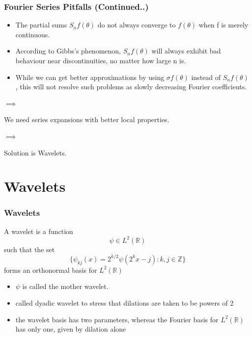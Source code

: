 \documentclass{beamer}
\begin{document}
\begin{frame}
    \frametitle{Fourier Series Pitfalls (Continued..)}
    
    \begin{itemize}
        \item The partial sums $S_n f (\theta )$ do not always converge to $f (\theta )$ when f is merely continuous.
        \item According to Gibbs’s phenomenon, $S_n f (\theta )$ will always exhibit bad behaviour near discontinuities, no matter how large n is.
        \item While we can get better approximations by using $\sigma f (\theta )$ instead of $S_n f (\theta )$ , this will not resolve such problems as
        slowly decreasing Fourier coefficients.
    \end{itemize}
    $\implies$

    \begin{center}
        We need series expansions with better local properties.     
    \end{center}
    
    $\implies$

    \begin{center}
        Solution is Wavelets.
    \end{center}
    

    \end{frame}

    

\section{Wavelets} %

\begin{frame}
\frametitle{Wavelets}
\begin{definition}[15.1.1]
    A wavelet is a function $$\psi \in L^2 \left({\mathbb{R}}\right)$$ such that the set
    $$\{\psi_{kj}(x) = 2^{k/2}\psi(2^kx-j): k,j \in \mathbb{Z} \}$$
    forms an orthonormal basis for $L^2\left({\mathbb{R}}\right)$
\end{definition}

\begin{itemize}
\item $\psi$ is called the mother wavelet.
\item called dyadic wavelet to stress that dilations are taken to be powers of 2
\item the wavelet basis has two parameters, whereas the Fourier basis for $L^2\left({\mathbb{R}}\right)$  has only one, given by dilation alone
\end{itemize}

\end{frame}
\end{document}
